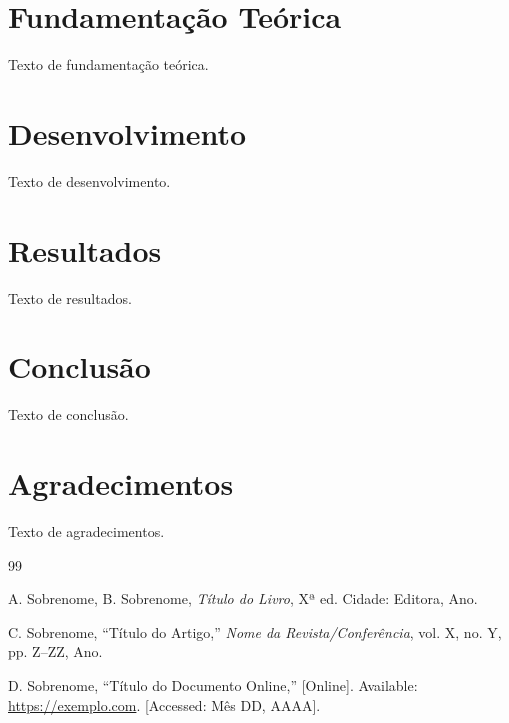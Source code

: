 \documentclass[conference]{IEEEtran}
\begin{document}
\section{Fundamentação Teórica}

Texto de fundamentação teórica.




\section{Desenvolvimento}

Texto de desenvolvimento.



\section{Resultados}

Texto de resultados.



\section{Conclusão}

Texto de conclusão.



\section*{Agradecimentos}

Texto de agradecimentos.

\begin{thebibliography}{99}

A. Sobrenome, B. Sobrenome, \textit{Título do Livro}, Xª ed. Cidade: Editora, Ano.

C. Sobrenome, ``Título do Artigo,'' \textit{Nome da Revista/Conferência}, vol. X, no. Y, pp. Z--ZZ, Ano.

D. Sobrenome, ``Título do Documento Online,'' [Online]. Available: \url{https://exemplo.com}. [Accessed: Mês DD, AAAA].

\end{thebibliography}
\end{document}

